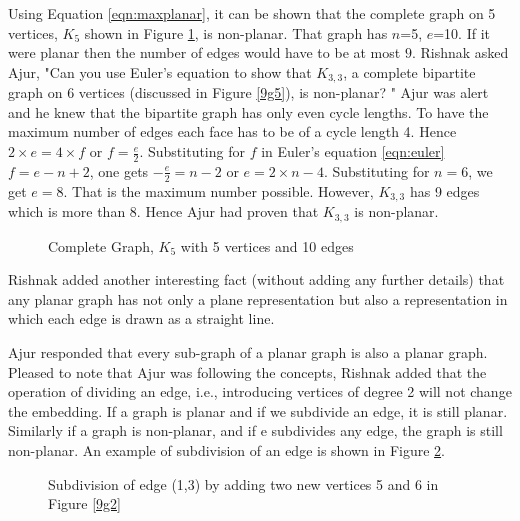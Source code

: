Using Equation \ref{eqn:maxplanar}, it can be shown that the complete graph on 5 vertices, $K_5$ shown in Figure \ref{9g10}, is non-planar. That graph has $n$=5, $e$=10. If it were planar then the number of edges would have to be at most $9$. 
Rishnak asked Ajur, "Can you use Euler's equation to show that $K_{3,3}$, a complete bipartite graph on 6 vertices (discussed in Figure \ref{9g5}), is non-planar? "
Ajur was alert and he knew that the bipartite graph has only even cycle lengths. To have the maximum number of edges each face has to be of a cycle length 4. Hence $2\times e =4 \times f$ or $f=\frac{e}{2}$. Substituting for $f$ in Euler's equation \ref{eqn:euler}
$f=e-n+2$, one gets $-\frac{e}{2}=n-2$ or $e=2\times n -4$. Substituting for $n=6$, we get $e=8$. That is the maximum number possible. However, $K_{3,3}$ has 9 edges which is more than 8. Hence Ajur had proven that $K_{3,3}$ is non-planar.
\begin{figure}
\begin{center}
\caption{ Complete Graph, $K_5$ with 5 vertices and 10 edges }\label{9g10}
\end{center}
\end{figure}
Rishnak added another interesting fact (without adding any further details) that any planar graph has not only a plane representation but also a representation in which each edge is drawn as a straight line.

Ajur responded that every sub-graph of a planar graph is also a planar graph. Pleased to note that Ajur was following the concepts, Rishnak added that the operation of dividing an edge, i.e., introducing vertices of degree 2 will not change the embedding. If a graph is planar and if we subdivide an edge, it is still planar. Similarly if a graph is non-planar, and if e subdivides any edge, the graph is still non-planar. An example of subdivision of an edge is shown in Figure \ref{9g9}. 

\begin{figure}[h]
\begin{center}
\caption{ Subdivision of edge (1,3) by adding two new vertices 5 and 6 in Figure \ref{9g2}}\label{9g9}
\end{center}
\end{figure}

